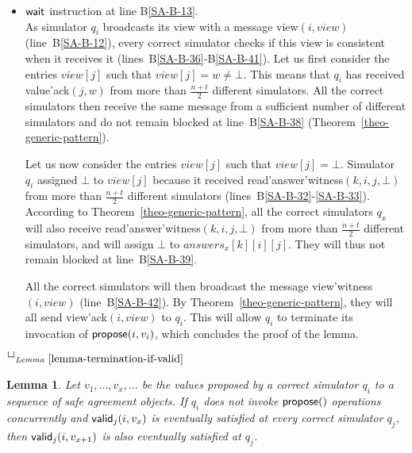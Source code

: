 \documentclass[11pt,letterpaper]{article}
\newtheorem{lemma}{Lemma}
\newlength {\afterproof}
\newcommand{\toto}{xxx}
\newenvironment{proofL}{\noindent{\bf Proof }}
{\hspace*{\fill}$\Box_{\mathit{Lemma}~\ref{\toto}}$\par\vspace{\afterproof}}
\begin{document}
\begin{proofL}
\begin{itemize}
\vspace{-0.2cm}
\item ${\sf wait}$ instruction at line B\ref{SA-B-13}.\\
As simulator $q_i$  broadcasts its view with a message
{\sc view}$(i,view)$  (line~B\ref{SA-B-12}),
every correct simulator  checks if this view is
consistent when it receives it (lines~B\ref{SA-B-36}-B\ref{SA-B-41}).
Let us first consider the entries $view[j]$ such that $view[j]=w\neq\bot$.
This means that $q_i$ has received {\sc value'ack}$(j,w)$ from more than
$\frac{n+t}{2}$ different simulators. All the
correct simulators then receive the same message from a sufficient number of
different simulators and do not remain blocked at line~B\ref{SA-B-38}
(Theorem~\ref{theo-generic-pattern}).

Let us now consider the entries $view[j]$ such that $view[j]=\bot$.
Simulator $q_i$ assigned $\bot$ to $view[j]$
 because it received
{\sc read'answer'witness}$(k,i,j,\bot)$ from more than
$\frac{n+t}{2}$ different simulators (lines~B\ref{SA-B-32}-\ref{SA-B-33}).
 According to 
Theorem~\ref{theo-generic-pattern}, all the correct simulators $q_x$
will also receive {\sc read'answer'witness}$(k,i,j,\bot)$ from more than
$\frac{n+t}{2}$ different simulators, and will assign $\bot$ to
$answers_x[k][i][j]$. They will thus not remain blocked at line~B\ref{SA-B-39}.

All the correct simulators will then broadcast the message
{\sc view'witness}$(i,view)$ (line~B\ref{SA-B-42}).
By Theorem~\ref{theo-generic-pattern}, they will
all send {\sc view'ack}$(i,view)$ to $q_i$. This will allow $q_i$ to
terminate its invocation of ${\sf propose}(i,v_i)$, which concludes the
proof of the lemma.
\end{itemize}
\vspace{-0.6cm}
\renewcommand{\toto}{lemma-termination-if-valid}
\end{proofL}



\begin{lemma}
\label{lemma-valid-if-correct}
Let $v_1,\ldots,v_x,\ldots$ be the values proposed by a correct simulator
$q_i$ to a sequence of safe agreement objects. If $q_i$ does not invoke
${\sf propose}()$ operations concurrently and ${\sf valid}_j(i,v_x)$ is
eventually satisfied at every correct simulator $q_j$, then
${\sf valid}_j(i,v_{x+1})$ is also eventually satisfied at $q_j$.
\end{lemma}
\end{document}
